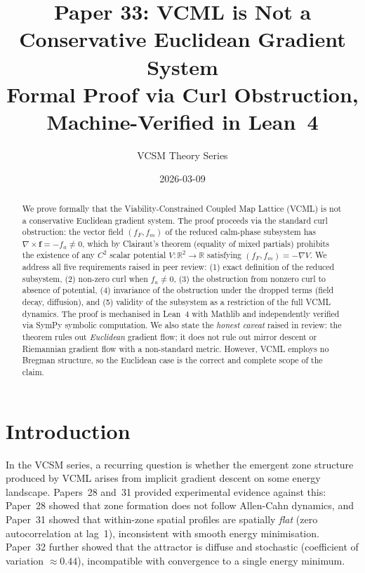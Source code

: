 \documentclass[11pt,a4paper]{article}
\title{\textbf{Paper 33: VCML is Not a Conservative Euclidean Gradient System}\\
\large Formal Proof via Curl Obstruction, Machine-Verified in Lean~4}
\author{VCSM Theory Series}
\date{2026-03-09}
\begin{document}
\maketitle

\begin{abstract}
We prove formally that the Viability-Constrained Coupled Map Lattice (VCML)
is not a conservative Euclidean gradient system.
The proof proceeds via the standard curl obstruction:
the vector field $(f_F, f_m)$ of the reduced calm-phase subsystem has
$\nabla\times \mathbf{f} = -f_a \neq 0$, which by Clairaut's theorem
(equality of mixed partials) prohibits the existence of any $C^2$
scalar potential $V:\mathbb{R}^2\to\mathbb{R}$ satisfying
$(f_F, f_m) = -\nabla V$.
We address all five requirements raised in peer review:
(1) exact definition of the reduced subsystem,
(2) non-zero curl when $f_a\neq 0$,
(3) the obstruction from nonzero curl to absence of potential,
(4) invariance of the obstruction under the dropped terms (field decay,
    diffusion),
and (5) validity of the subsystem as a restriction of the full VCML dynamics.
The proof is mechanised in Lean~4 with Mathlib and independently verified
via SymPy symbolic computation.
We also state the \emph{honest caveat} raised in review: the theorem
rules out \emph{Euclidean} gradient flow; it does not rule out
mirror descent or Riemannian gradient flow with a non-standard metric.
However, VCML employs no Bregman structure, so the Euclidean case is
the correct and complete scope of the claim.
\end{abstract}

\tableofcontents
\newpage

\section{Introduction}
\label{sec:intro}

In the VCSM series, a recurring question is whether the emergent zone
structure produced by VCML arises from implicit gradient descent on some
energy landscape.
Papers~28 and~31 provided experimental evidence against this:
Paper~28 showed that zone formation does not follow Allen-Cahn dynamics,
and Paper~31 showed that within-zone spatial profiles are spatially
\emph{flat} (zero autocorrelation at lag~1), inconsistent with
smooth energy minimisation.
Paper~32 further showed that the attractor is diffuse and stochastic
(coefficient of variation $\approx 0.44$), incompatible with
convergence to a single energy minimum.
\end{document}
